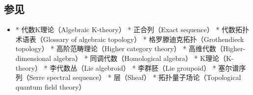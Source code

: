 \subsection{参见}
\begin{itemize}
\item * 代数K理论（Algebraic K-theory）
* 正合列（Exact sequence）
* 代数拓扑术语表（Glossary of algebraic topology）
* 格罗滕迪克拓扑（Grothendieck topology）
* 高阶范畴理论（Higher category theory）
* 高维代数（Higher-dimensional algebra）
* 同调代数（Homological algebra）
* K理论（K-theory）
* 李代数丛（Lie algebroid）
* 李群胚（Lie groupoid）
* 塞尔谱序列（Serre spectral sequence）
* 层（Sheaf）
* 拓扑量子场论（Topological quantum field theory）

\end{itemize}